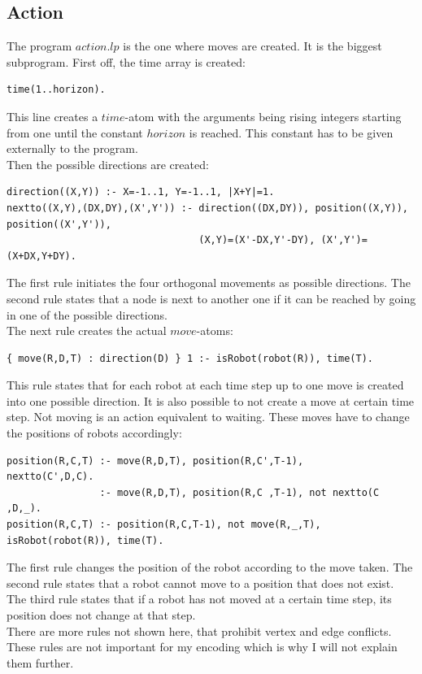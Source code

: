 \documentclass[runningheads]{llncs}
\begin{document}
\subsection{Action}
The program $action.lp$ is the one where moves are created. It is the biggest subprogram. First off, the time array is created:
\begin{verbatim}
time(1..horizon).
\end{verbatim}
This line creates a $time$-atom with the arguments being rising integers starting from one until the constant $horizon$ is reached. This constant has to be given externally to the program.  \\
Then the possible directions are created:
\begin{verbatim}
direction((X,Y)) :- X=-1..1, Y=-1..1, |X+Y|=1.
nextto((X,Y),(DX,DY),(X',Y')) :- direction((DX,DY)), position((X,Y)), position((X',Y')),
                                 (X,Y)=(X'-DX,Y'-DY), (X',Y')=(X+DX,Y+DY).
\end{verbatim}
The first rule initiates the four orthogonal movements as possible directions. The second rule states that a node is next to another one if it can be reached by going in one of the possible directions. \\
The next rule creates the actual $move$-atoms:
\begin{verbatim}
{ move(R,D,T) : direction(D) } 1 :- isRobot(robot(R)), time(T).
\end{verbatim}
This rule states that for each robot at each time step up to one move is created into one possible direction. It is also possible to not create a move at certain time step. Not moving is an action equivalent to waiting. These moves have to change the positions of robots accordingly:
\begin{verbatim}
position(R,C,T) :- move(R,D,T), position(R,C',T-1),     nextto(C',D,C).
                :- move(R,D,T), position(R,C ,T-1), not nextto(C ,D,_).
position(R,C,T) :- position(R,C,T-1), not move(R,_,T), isRobot(robot(R)), time(T).
\end{verbatim}
The first rule changes the position of the robot according to the move taken. The second rule states that a robot cannot move to a position that does not exist. The third rule states that if a robot has not moved at a certain time step, its position does not change at that step. \\
There are more rules not shown here, that prohibit vertex and edge conflicts. These rules are not important for my encoding which is why I will not explain them further. 
\end{document}
